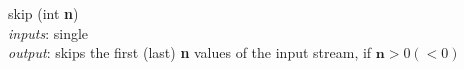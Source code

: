 \documentclass{dithesis}
\begin{document}
\begin{description}
\hfill
\begin{minipage}[c]{\rrr}

\end{minipage}
\newline \newline \newline
\begin{minipage}[c]{\lll}
\item[skip] (int \textbf{n}) \\
	\textit{inputs}: single \\
	\textit{output}: skips the first (last) \textbf{n} values of the input stream, if $\textbf{n} > 0 (< 0)$
\end{minipage}
\hfill
\begin{minipage}[c]{\rrr}

\end{minipage}
\newline \newline \newline
\end{description}
\end{document}
